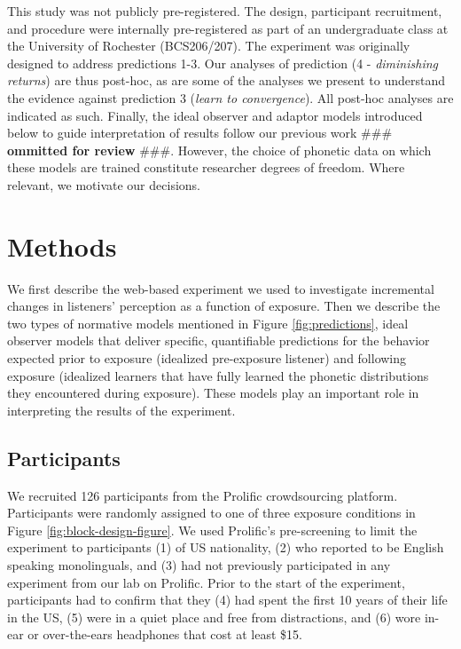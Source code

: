 \documentclass[
  11pt,
  man,mask,floatsintext]{apa6}
\begin{document}
This study was not publicly pre-registered. The design, participant recruitment, and procedure were internally pre-registered as part of an undergraduate class at the University of Rochester (BCS206/207). The experiment was originally designed to address predictions 1-3. Our analyses of prediction (4 - \emph{diminishing returns}) are thus post-hoc, as are some of the analyses we present to understand the evidence against prediction 3 (\emph{learn to convergence}). All post-hoc analyses are indicated as such. Finally, the ideal observer and adaptor models introduced below to guide interpretation of results follow our previous work \#\#\# \textbf{ommitted for review} \#\#\#. However, the choice of phonetic data on which these models are trained constitute researcher degrees of freedom. Where relevant, we motivate our decisions.

\section{Methods}\label{methods}

We first describe the web-based experiment we used to investigate incremental changes in listeners' perception as a function of exposure. Then we describe the two types of normative models mentioned in Figure \ref{fig:predictions}, ideal observer models that deliver specific, quantifiable predictions for the behavior expected prior to exposure (idealized pre-exposure listener) and following exposure (idealized learners that have fully learned the phonetic distributions they encountered during exposure). These models play an important role in interpreting the results of the experiment.

\subsection{Participants}\label{participants}

We recruited 126 participants from the Prolific crowdsourcing platform. Participants were randomly assigned to one of three exposure conditions in Figure \ref{fig:block-design-figure}. We used Prolific's pre-screening to limit the experiment to participants (1) of US nationality, (2) who reported to be English speaking monolinguals, and (3) had not previously participated in any experiment from our lab on Prolific. Prior to the start of the experiment, participants had to confirm that they (4) had spent the first 10 years of their life in the US, (5) were in a quiet place and free from distractions, and (6) wore in-ear or over-the-ears headphones that cost at least \$15.
\end{document}
